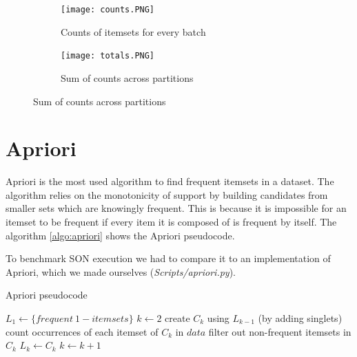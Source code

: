 \documentclass[a4paper]{article}
\begin{document}
	\begin{figure}[h]
		\centering
		
		\begin{subfigure}[b]{0.4\textwidth}
			\centering
			\texttt{[image: counts.PNG]}
         	\caption{Counts of itemsets for every batch}
         	\label{fig:counts}
		\end{subfigure}
		\hfill
		\begin{subfigure}[b]{0.4\textwidth}
			\centering
			\texttt{[image: totals.PNG]}
         	\caption{Sum of counts across partitions}
         	\label{fig:totals}
		\end{subfigure}
	\end{figure}
	
	\newpage
	
	\section{Apriori}
	\label{section:apriori}
	
	Apriori is the most used algorithm to find frequent itemsets in a dataset. The algorithm relies on the monotonicity of support by building candidates from smaller sets which are knowingly frequent. This is because it is impossible for an itemset to be frequent if every item it is composed of is frequent by itself. The algorithm \ref{algo:apriori} shows the Apriori pseudocode.
	
	To benchmark SON execution we had to compare it to an implementation of Apriori, which we made ourselves (\textit{Scripts/apriori.py}).
	
\begin{algorithm}
\caption{Apriori pseudocode}
\label{algo:apriori}
\begin{algorithmic}[1]
	\State $L_1 \gets \{frequent \ 1-itemsets\}$ 
    	\State $k \gets 2$
    		\State create $C_k$ using $L_{k-1}$ (by adding singlets) 
    		\State count occurrences of each itemset of $C_k$ in $data$
    		\State filter out non-frequent itemsets in $C_k$
    		\State $L_k \gets C_k$
    		\State $k \gets k+1$
    	\EndWhile
\EndFunction
\end{algorithmic}
\end{algorithm}
\end{document}
